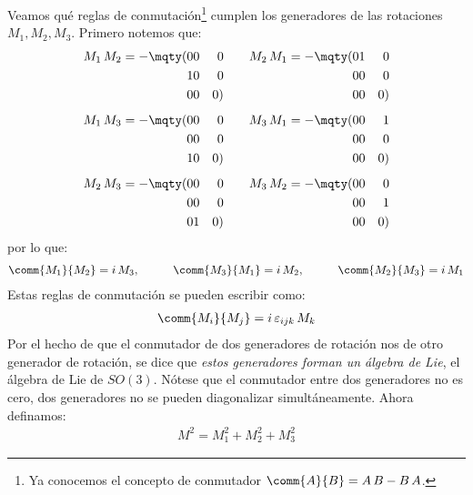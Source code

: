 Veamos qué reglas de conmutación\footnote{Ya conocemos el concepto de conmutador $\comm{A}{B} = A \, B - B \, A$.} cumplen los generadores de las rotaciones $M_{1}, M_{2}, M_{3}$. Primero notemos que:
\begin{align}
\begin{aligned}
M_{1} \, M_{2} = - \mqty(0 & 0 & 0 \\ 1 & 0 & 0 \\ 0 & 0 & 0) \\[0.5em] 
M_{1} \, M_{3} = - \mqty(0 & 0 & 0 \\ 0 & 0 & 0 \\ 1 & 0 & 0) \\[0.5em]
M_{2} \, M_{3} = - \mqty(0 & 0 & 0 \\ 0 & 0 & 0 \\ 0 & 1 & 0)
\end{aligned}
\qquad
\begin{aligned}
M_{2} \, M_{1} = - \mqty(0 & 1 & 0 \\ 0 & 0 & 0 \\ 0 & 0 & 0) \\[0.5em]
M_{3} \, M_{1} = - \mqty(0 & 0 & 1 \\ 0 & 0 & 0 \\ 0 & 0 & 0) \\[0.5em]
M_{3} \, M_{2} = - \mqty(0 & 0 & 0 \\ 0 & 0 & 1 \\ 0 & 0 & 0)
\end{aligned}
\label{eq:ecuacion_10_081}
\end{align}
por lo que:
\begin{align}
\comm{M_{1}}{M_{2}} = i \, M_{3}, \hspace{1cm} \comm{M_{3}}{M_{1}} = i \, M_{2}, \hspace{1cm} \comm{M_{2}}{M_{3}} = i \, M_{1} \label{eq:ecuacion_10_082}
\end{align}
Estas reglas de conmutación se pueden escribir como:
\begin{align}
\comm{M_{i}}{M_{j}} = i \, \varepsilon_{ijk} \, M_{k}
\label{eq:ecuacion_10_083}
\end{align}
Por el hecho de que el conmutador de dos generadores de rotación nos de otro generador de rotación, se dice que \emph{estos generadores forman un álgebra de Lie}, el álgebra de Lie de $SO(3)$. Nótese que el conmutador entre dos generadores no es cero, dos generadores no se pueden diagonalizar simultáneamente. Ahora definamos:
\begin{align}
M^{2} = M_{1}^{2} + M_{2}^{2} + M_{3}^{2}
\label{eq:ecuacion_10_084}
\end{align}

